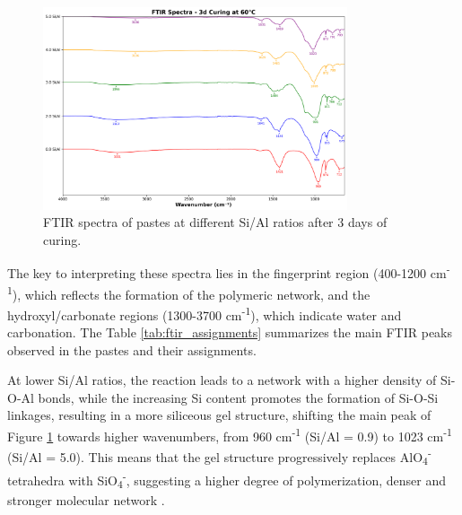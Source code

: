 \begin{figure}[H]
    \centering
    \includegraphics[width=0.8\textwidth]{Cap4/images/ftir_comparison_3d_curing.png}
    \caption{FTIR spectra of pastes at different Si/Al ratios after 3 days of curing.}
    \label{fig:ftir_pastes}
\end{figure}

The key to interpreting these spectra lies in the fingerprint region (400-1200 cm\textsuperscript{-1}), which reflects the formation of the polymeric network, and the hydroxyl/carbonate regions (1300-3700 cm\textsuperscript{-1}), which indicate water and carbonation.
The Table \ref{tab:ftir_assignments} summarizes the main FTIR peaks observed in the pastes and their assignments.

At lower Si/Al ratios, the reaction leads to a network with a higher density of Si-O-Al bonds, while the increasing Si content promotes the formation of Si-O-Si linkages, resulting in a more siliceous gel structure, shifting the main peak of Figure \ref{fig:ftir_pastes} towards higher wavenumbers, from 960 cm\textsuperscript{-1} (Si/Al = 0.9) to 1023 cm\textsuperscript{-1} (Si/Al = 5.0).
This means that the gel structure progressively replaces AlO\textsubscript{4}\textsuperscript{-} tetrahedra with SiO\textsubscript{4}\textsuperscript{-}, suggesting a higher degree of polymerization, denser and stronger molecular network \cite{pachecotorgal2014handbook}.

